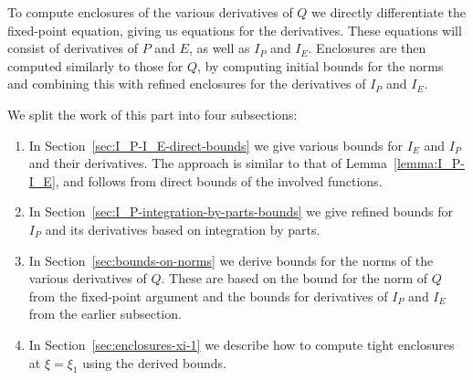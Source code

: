 \documentclass[11pt]{article}
\begin{document}
To compute enclosures of the various derivatives of \(Q\) we directly
differentiate the fixed-point equation, giving us equations for the
derivatives. These equations will consist of derivatives of \(P\) and
\(E\), as well as \(I_{P}\) and \(I_{E}\). Enclosures are then
computed similarly to those for \(Q\), by computing initial bounds for the
norms and combining this with refined enclosures for the derivatives
of \(I_{P}\) and \(I_{E}\).

We split the work of this part into four subsections:
\begin{enumerate}
\item In Section~\ref{sec:I_P-I_E-direct-bounds} we give various
  bounds for \(I_{E}\) and \(I_{P}\) and their derivatives. The
  approach is similar to that of Lemma~\ref{lemma:I_P-I_E}, and follows
  from direct bounds of the involved functions.
\item In Section~\ref{sec:I_P-integration-by-parts-bounds} we give
  refined bounds for \(I_{P}\) and its derivatives based on integration
  by parts.
\item In Section~\ref{sec:bounds-on-norms} we derive bounds for the
  norms of the various derivatives of \(Q\). These are based on the
  bound for the norm of \(Q\) from the fixed-point argument and the
  bounds for derivatives of \(I_{P}\) and \(I_{E}\) from the earlier
  subsection.
\item In Section~\ref{sec:enclosures-xi-1} we describe how to compute
  tight enclosures at \(\xi = \xi_{1}\) using the derived bounds.
\end{enumerate}
\end{document}
